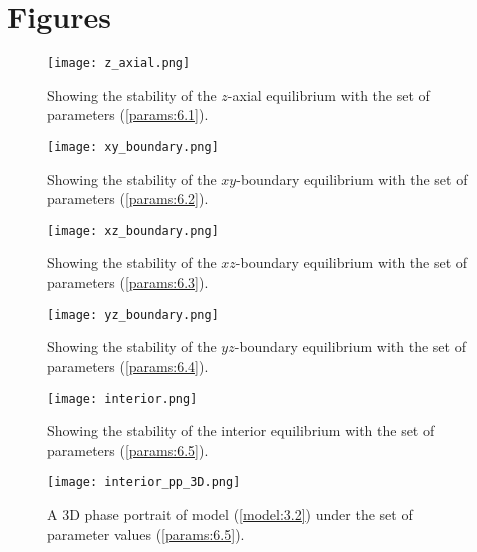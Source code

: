 \section{Figures}\label{sec:figures}
\begin{figure}[H]
    \centering
    \centerline{\texttt{[image: z\_axial.png]}}
    \caption{Showing the stability of the $z$-axial equilibrium with the set of parameters (\ref{params:6.1}).}
    \label{fig:z_axial}
\end{figure}

\begin{figure}[H]
    \centering
    \centerline{\texttt{[image: xy\_boundary.png]}}
    \caption{Showing the stability of the $xy$-boundary equilibrium with the set of parameters (\ref{params:6.2}).}
    \label{fig:xy_boundary}
\end{figure}

\begin{figure}[H]
    \centering
    \centerline{\texttt{[image: xz\_boundary.png]}}
    \caption{Showing the stability of the $xz$-boundary equilibrium with the set of parameters (\ref{params:6.3}).}
    \label{fig:xz_boundary}
\end{figure}


\begin{figure}[H]
    \centering
    \centerline{\texttt{[image: yz\_boundary.png]}}
    \caption{Showing the stability of the $yz$-boundary equilibrium with the set of parameters (\ref{params:6.4}).}
    \label{fig:yz_boundary}
\end{figure}

\begin{figure}[H]
    \centering
    \centerline{\texttt{[image: interior.png]}}
    \caption{Showing the stability of the interior equilibrium with the set of parameters (\ref{params:6.5}).}
    \label{fig:interior}
\end{figure}

\begin{figure}[H]
    \centering
    \centerline{\texttt{[image: interior\_pp\_3D.png]}}
    \caption{A 3D phase portrait of model (\ref{model:3.2}) under the set of parameter values (\ref{params:6.5}).}
    \label{fig:phase_plane_3d}
\end{figure}


